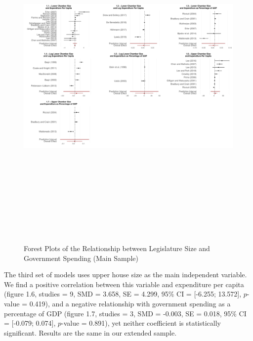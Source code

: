 \documentclass[11pt,a4paper,]{article}
\begin{document}
\begin{landscape}
\begin{figure}[!ht]
\centering
\caption{Forest Plots of the Relationship between Legislature Size and Government Spending (Main Sample)}
\vspace{0.3cm}
\includegraphics[width=25cm,height=17cm]{../graphs/graph1.pdf}
\label{fig:plots}
\end{figure}
\end{landscape}

The third set of models uses upper house size as the main independent
variable. We find a positive correlation between this variable and
expenditure per capita (figure 1.6, studies = 9, SMD = 3.658, SE =
4.299, 95\% CI = {[}-6.255; 13.572{]}, \(p\)-value = 0.419), and a
negative relationship with government spending as a percentage of GDP
(figure 1.7, studies = 3, SMD = -0.003, SE = 0.018, 95\% CI = {[}-0.079;
0.074{]}, \(p\)-value = 0.891), yet neither coefficient is statistically
significant. Results are the same in our extended sample.
\end{document}
